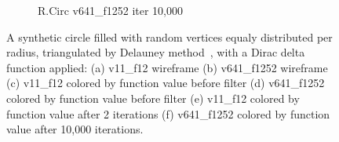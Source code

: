 \begin{figure}[ht]
{\begin{subfigure}[b]{0.48\linewidth}
		\caption{R.Circ v641\_f1252 iter 10,000}\label{fig:rcirc.f}
	\end{subfigure}}
	{\caption[Synthetic random vertices equally distributed per radius, Dirac delta function]{A synthetic circle filled with random vertices equaly distributed per radius, triangulated by Delauney method~\cite[p.~??]{todoCitation}, with a Dirac delta function applied: (a) v11\_f12 wireframe (b) v641\_f1252 wireframe (c) v11\_f12 colored by function value before filter (d) v641\_f1252 colored by function value before filter (e) v11\_f12 colored by function value after 2 iterations (f) v641\_f1252 colored by function value after 10,000 iterations.
}\label{fig:rcirc}}
\end{figure}
